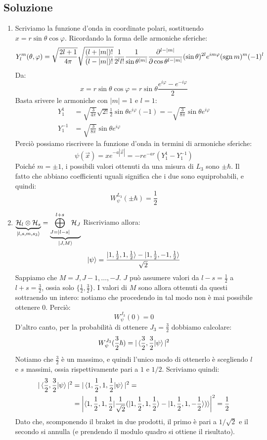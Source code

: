 \documentclass[../../FisicaTeorica.tex]{subfiles}
\begin{document}
\subsection{Soluzione}
\begin{enumerate}
\item Scriviamo la funzione d'onda in coordinate polari, sostituendo $x=r\sin\theta\cos\varphi$. Ricordando la forma delle armoniche sferiche:
\[
Y^m_l(\theta,\varphi)=\sqrt{\frac{2l+1}{4\pi}}\sqrt{\frac{(l+|m|)!}{(l-|m|)!}}\frac{1}{2^l l!} \frac{1}{\sin\theta^{|m|}}\frac{\partial^{l-|m|}}{\partial \cos\theta^{l-|m|}}(\sin\theta)^{2l} e^{im\varphi}(\operatorname{sgn} m)^{m}(-1)^l
\]
Da:
\[
x=r\sin\theta\cos\varphi= r\sin\theta \frac{e^{i\varphi}-e^{-i\varphi}}{2}
\]
Basta srivere le armoniche con $|m|=1$ e $l=1$:
\begin{align*}
Y^1_1 &= \sqrt{\frac{3}{4\pi}}\sqrt{2!}\frac{1}{2}\sin\theta e^{i\varphi}(-1)=-\sqrt{\frac{3}{8\pi}}\sin\theta e^{i\varphi}\\
Y^{-1}_1 &= \sqrt{\frac{3}{8\pi}} \sin\theta e^{i\varphi}
\end{align*}
Perciò possiamo riscrivere la funzione d'onda in termini di armoniche sferiche:
\[
\psi(\vec{x})=x e^{-a|\vec{x}|}=-r e^{-ar}(Y_1^1 - Y^{-1}_1)
\]
Poiché $m=\pm 1$, i possibili valori ottenuti da una misura di $L_3$ sono $\pm\hbar$. Il fatto che abbiano coefficienti uguali significa che i due sono equiprobabili, e quindi:
\[
W_\psi^{L_3}(\pm \hbar) = \frac{1}{2}
\]
\item $\displaystyle \underbrace{\mathcal{H}_{l}\otimes \mathcal{H}_s}_{\ket{l,s,m,s_3}} = \underbrace{\bigoplus_{J=|l-s|}^{l+s}\mathcal{H}_J}_{\ket{J, M}}$
Riscriviamo allora:
\[
\ket{\psi}=\frac{\ket{1,\frac{1}{2}, 1, \frac{1}{2}}-\ket{1,\frac{1}{2}, -1,\frac{1}{2}}}{\sqrt{2}}
\] 
Sappiamo che $M=J, J-1, \dots, -J$. $J$ può assumere valori da $l-s=\frac{1}{2}$ a $l+s=\frac{3}{2}$, ossia solo $\{\frac{1}{2}, \frac{3}{2}\}$. I valori di $M$ sono allora ottenuti da questi sottraendo un intero: notiamo che procedendo in tal modo non è mai possibile ottenere $0$. Perciò:
\[
W_\psi^{J_3}(0)=0
\]
D'altro canto, per la probabilità di ottenere $J_3=\frac{3}{2}$ dobbiamo calcolare:
\[
W_\psi^{J_3}(\frac{3}{2}\hbar) = |\braket{\frac{3}{2}, \frac{3}{2}|\psi}|^2
\]
Notiamo che $\frac{3}{2}$ è un massimo, e quindi l'unico modo di ottenerlo è scegliendo $l$ e $s$ massimi, ossia rispettivamente pari a $1$ e $1/2$. Scriviamo quindi:
\begin{align*}
|\braket{\frac{3}{2}, \frac{3}{2}|\psi}|^2 &=
|\braket{1,\frac{1}{2},1,\frac{1}{2}|\psi}|^2 =\\
&= \left|
\braket{1,\frac{1}{2},1,\frac{1}{2}|\frac{1}{\sqrt{2}}(\ket{1,\frac{1}{2},1,\frac{1}{2}}-\ket{1,\frac{1}{2},1,-\frac{1}{2}})}
 \right|^2 = \frac{1}{2}
\end{align*}
Dato che, scomponendo il braket in due prodotti, il primo è pari a $1/\sqrt{2}$ e il secondo si annulla (e prendendo il modulo quadro si ottiene il risultato).


\end{enumerate}
\end{document}
